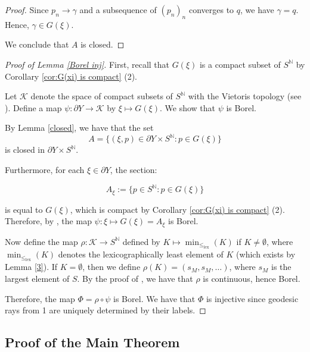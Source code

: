 \documentclass{article}[11pt]
\newcommand{\N}{\mathbb{N}}
\newcommand{\DO}[1]{{\textcolor{green}{{\bf Damian:}{\small {~#1~}}}}}
\begin{document}
{\begin{proof}
    Since $p_n \to \gamma$ and a subsequence of $(p_n)_n$ converges to $q$, we have $\gamma = q$. Hence, $\gamma \in G(\xi)$. 

    We conclude that $A$ is closed. 
    
\end{proof}


\begin{proof}[Proof of Lemma \ref{Borel inj}]

    First, recall that $G(\xi)$ is a compact subset of $S^{\N}$ by Corollary \ref{cor:G(xi) is compact} (2). 

    Let $\mathcal{K}$ denote the space of compact subsets of $S^{\N}$ with the Vietoris topology (see \cite[$\mathsection$I.4.4]{Kech95}). Define a map $\psi: \partial Y \to \mathcal{K}$ by $\xi \mapsto G(\xi)$. We show that $\psi$ is Borel. 

    By Lemma \ref{closed}, we have that the set $$A = \{(\xi, p) \in \partial Y \times S^{\N}: p \in G(\xi)\}$$ is closed in $\partial Y \times S^{\N}$.

    Furthermore,  for each $\xi \in \partial Y$, the section: 

    $$A_{\xi} := \{p \in S^{\N} : p \in G(\xi)\}$$

    is equal to $G(\xi)$, which is compact by Corollary \ref{cor:G(xi) is compact} (2). Therefore, by \cite[Theorem 28.8]{Kech95}, the map $\psi: \xi \mapsto G(\xi) = A_{\xi}$ is Borel.

    Now define the map $\rho : \mathcal{K} \to S^{\N}$ defined by $K \mapsto \min_{\leq_{\mathrm{lex}}}(K)$ if $K \neq \emptyset$, where $\min_{\leq_{\mathrm{lex}}}(K)$ denotes the lexicographically least element of $K$ (which exists by Lemma \ref{3}). If $K = \emptyset$, then we define $\rho(K) = (s_M, s_M,\ldots)$, where $s_M$ is the largest element of $S$. By the proof of \cite[Proposition 3.3]{NaryshVacc}, we have that $\rho$ is continuous, hence Borel.

    Therefore, the map $\Phi = \rho \circ \psi$ is Borel. We have that $\Phi$ is injective since geodesic rays from 1 are uniquely determined by their labels.  
    
\end{proof}

\subsection{Proof of the Main Theorem}%

}
\end{document}
